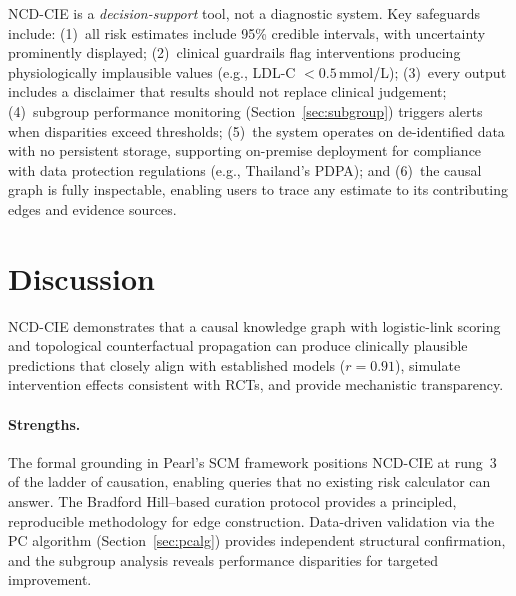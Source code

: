 \documentclass[runningheads]{llncs}
\begin{document}
NCD-CIE is a \emph{decision-support} tool, not a diagnostic system.
Key safeguards include: (1)~all risk estimates include 95\% credible
intervals, with uncertainty prominently displayed; (2)~clinical
guardrails flag interventions producing physiologically implausible
values (e.g., LDL-C $< 0.5$\,mmol/L); (3)~every output includes a
disclaimer that results should not replace clinical judgement;
(4)~subgroup performance monitoring (Section~\ref{sec:subgroup})
triggers alerts when disparities exceed thresholds; (5)~the system
operates on de-identified data with no persistent storage, supporting
on-premise deployment for compliance with data protection regulations
(e.g., Thailand's PDPA); and (6)~the causal graph is fully
inspectable, enabling users to trace any estimate to its contributing
edges and evidence sources.

\section{Discussion}\label{sec:discussion}

NCD-CIE demonstrates that a causal knowledge graph with logistic-link
scoring and topological counterfactual propagation can produce
clinically plausible predictions that closely align with established
models ($r = 0.91$), simulate intervention effects consistent with
RCTs, and provide mechanistic transparency.

\paragraph{Strengths.}
The formal grounding in Pearl's SCM framework positions NCD-CIE at
rung~3 of the ladder of causation, enabling queries that no existing
risk calculator can answer.  The Bradford Hill--based curation
protocol provides a principled, reproducible methodology for edge
construction.  Data-driven validation via the PC algorithm
(Section~\ref{sec:pcalg}) provides independent structural
confirmation, and the subgroup analysis reveals performance
disparities for targeted improvement.
\end{document}
